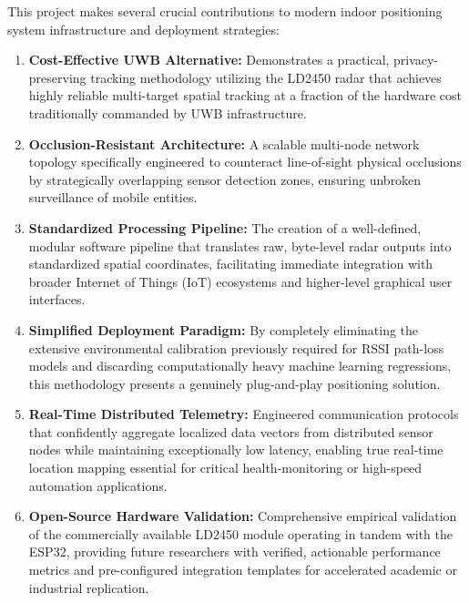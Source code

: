 This project makes several crucial contributions to modern indoor positioning system infrastructure and deployment strategies:

\begin{enumerate}
    \item \textbf{Cost-Effective UWB Alternative:} Demonstrates a practical, privacy-preserving tracking methodology utilizing the LD2450 radar that achieves highly reliable multi-target spatial tracking at a fraction of the hardware cost traditionally commanded by UWB infrastructure.
    
    \item \textbf{Occlusion-Resistant Architecture:} A scalable multi-node network topology specifically engineered to counteract line-of-sight physical occlusions by strategically overlapping sensor detection zones, ensuring unbroken surveillance of mobile entities.
    
    \item \textbf{Standardized Processing Pipeline:} The creation of a well-defined, modular software pipeline that translates raw, byte-level radar outputs into standardized spatial coordinates, facilitating immediate integration with broader Internet of Things (IoT) ecosystems and higher-level graphical user interfaces.
    
    \item \textbf{Simplified Deployment Paradigm:} By completely eliminating the extensive environmental calibration previously required for RSSI path-loss models and discarding computationally heavy machine learning regressions, this methodology presents a genuinely plug-and-play positioning solution.
    
    \item \textbf{Real-Time Distributed Telemetry:} Engineered communication protocols that confidently aggregate localized data vectors from distributed sensor nodes while maintaining exceptionally low latency, enabling true real-time location mapping essential for critical health-monitoring or high-speed automation applications.
    
    \item \textbf{Open-Source Hardware Validation:} Comprehensive empirical validation of the commercially available LD2450 module operating in tandem with the ESP32, providing future researchers with verified, actionable performance metrics and pre-configured integration templates for accelerated academic or industrial replication.
\end{enumerate}

